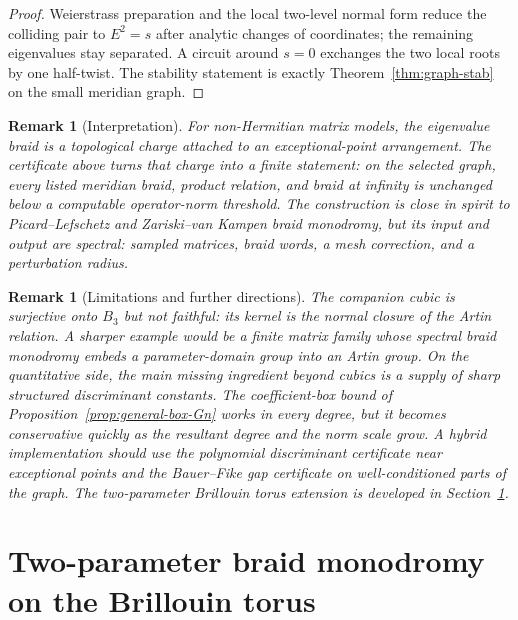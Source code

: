 \documentclass[11pt]{article}
\newtheorem{remark}[theorem]{Remark}
\numberwithin{equation}{section}
\begin{document}
\begin{proof}
Weierstrass preparation and the local two-level normal form reduce the
colliding pair to \(E^2=s\) after analytic changes of coordinates; the
remaining eigenvalues stay separated.  A circuit around \(s=0\) exchanges
the two local roots by one half-twist.  The stability statement is exactly
Theorem~\ref{thm:graph-stab} on the small meridian graph.
\end{proof}

\begin{remark}[Interpretation]
For non-Hermitian matrix models, the eigenvalue braid is a topological
charge attached to an exceptional-point arrangement.  The certificate above
turns that charge into a finite statement: on the selected graph, every
listed meridian braid, product relation, and braid at infinity is unchanged
below a computable operator-norm threshold.  The construction is close in
spirit to Picard--Lefschetz and Zariski--van Kampen braid monodromy, but its
input and output are spectral: sampled matrices, braid words, a mesh
correction, and a perturbation radius.
\end{remark}

\begin{remark}[Limitations and further directions]
The companion cubic is surjective onto \(B_3\) but not faithful: its kernel
is the normal closure of the Artin relation.  A sharper example would be a
finite matrix family whose spectral braid monodromy embeds a parameter-domain
group into an Artin group.  On the quantitative side, the main missing
ingredient beyond cubics is a supply of sharp structured
discriminant constants.  The coefficient-box bound of
Proposition~\ref{prop:general-box-Gn} works in every degree, but it becomes
conservative quickly as the resultant degree and the norm scale grow.  A
hybrid implementation should use the polynomial discriminant certificate near
exceptional points and the Bauer--Fike gap certificate on well-conditioned
parts of the graph.  The two-parameter Brillouin torus extension is
developed in Section~\ref{sec:torus}.
\end{remark}


\section{Two-parameter braid monodromy on the Brillouin torus}
\label{sec:torus}
\end{document}
